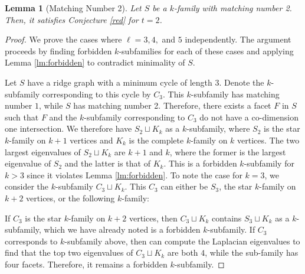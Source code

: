 \documentclass[11pt]{article}
\newtheorem{lm}{Lemma}
\begin{document}
\begin{lm}[Matching Number 2]
Let $S$ be a $k$-family with matching number 2. Then, it satisfies Conjecture \ref{red} for $t = 2$.
\end{lm}

\begin{proof}
We prove the cases where $\ell = 3, 4,$ and $5$ independently. The argument proceeds by finding forbidden $k$-subfamilies for each of these cases and applying Lemma \ref{lm:forbidden} to contradict minimality of $S$.

Let $S$ have a ridge graph with a minimum cycle of length $3$. Denote the $k$-subfamily corresponding to this cycle by $C_3$. This $k$-subfamily has matching number $1$, while $S$ has matching number 2. Therefore, there exists a facet $F$ in $S$ such that $F$ and the $k$-subfamily corresponding to $C_3$ do not have a co-dimension one intersection. We therefore have $S_2 \sqcup K_k$ as a $k$-subfamily, where $S_2$ is the star $k$-family on $k+1$ vertices and $K_k$ is the complete $k$-family on $k$ vertices. The two largest eigenvalues of $S_2 \sqcup K_k$ are $k+1$ and $k$, where the former is the largest eigenvalue of $S_2$ and the latter is that of $K_k$. This is a forbidden $k$-subfamily for $k > 3$ since it violates Lemma \ref{lm:forbidden}. To note the case for $k = 3$, we consider the $k$-subfamily $C_3 \sqcup K_k$. This $C_3$ can either be $S_3$, the star $k$-family on $k +2$ vertices, or the following $k$-family:

\begin{figure}[!ht]
\centering
{}
\end{figure}



\noindent If $C_3$ is the star $k$-family on $k+2$ vertices, then $C_3 \sqcup K_k$ contains $S_3 \sqcup K_k$ as a $k$-subfamily, which we have already noted is a forbidden $k$-subfamily. If $C_3$ corresponds to $k$-subfamily above, then can compute the Laplacian eigenvalues to find that the top two eigenvalues of $C_3 \sqcup K_k$ are both $4$, while the sub-family has four facets. Therefore, it remains a forbidden $k$-subfamily.



\end{proof}
\end{document}

